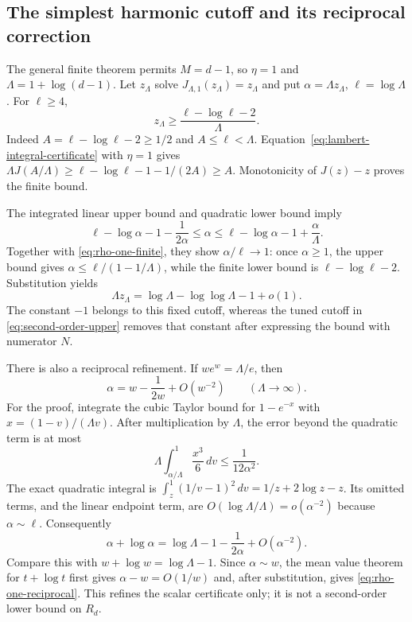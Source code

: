 \subsection{The simplest harmonic cutoff and its reciprocal correction}
\label{app:reciprocal-cutoff}
The general finite theorem permits $M=d-1$, so $\eta=1$ and
$\Lambda=1+\log(d-1)$. Let $z_\Lambda$ solve
$J_{\Lambda,1}(z_\Lambda)=z_\Lambda$ and put
$\alpha=\Lambda z_\Lambda$, $\ell=\log\Lambda$. For $\ell\ge4$,
\begin{equation}\label{eq:rho-one-finite}
 z_\Lambda\ge\frac{\ell-\log\ell-2}{\Lambda}.
\end{equation}
Indeed $A=\ell-\log\ell-2\ge1/2$ and $A\le\ell<\Lambda$.
Equation~\eqref{eq:lambert-integral-certificate} with $\eta=1$ gives
$\Lambda J(A/\Lambda)\ge\ell-\log\ell-1-1/(2A)\ge A$.
Monotonicity of $J(z)-z$ proves the finite bound.

The integrated linear upper bound and quadratic lower bound imply
\[
 \ell-\log\alpha-1-\frac1{2\alpha}
 \le\alpha\le\ell-\log\alpha-1+\frac\alpha\Lambda.
\]
Together with \eqref{eq:rho-one-finite}, they show $\alpha/\ell\to1$:
once $\alpha\ge1$, the upper bound gives
$\alpha\le\ell/(1-1/\Lambda)$, while the finite lower bound is
$\ell-\log\ell-2$. Substitution yields
\begin{equation}\label{eq:rho-one-asymptotic}
 \Lambda z_\Lambda=\log\Lambda-\log\log\Lambda-1+o(1).
\end{equation}
The constant $-1$ belongs to this fixed cutoff, whereas the tuned
cutoff in \eqref{eq:second-order-upper} removes that constant after
expressing the bound with numerator $N$.

There is also a reciprocal refinement. If $w e^w=\Lambda/e$, then
\begin{equation}\label{eq:rho-one-reciprocal}
 \alpha=w-\frac1{2w}+O(w^{-2})\qquad(\Lambda\to\infty).
\end{equation}
For the proof, integrate the cubic Taylor bound for $1-e^{-x}$ with
$x=(1-v)/(\Lambda v)$. After multiplication by $\Lambda$, the error
beyond the quadratic term is at most
\[
 \Lambda\int_{\alpha/\Lambda}^1\frac{x^3}{6}\,dv
 \le\frac1{12\alpha^2}.
\]
The exact quadratic integral is
$\int_z^1(1/v-1)^2\,dv=1/z+2\log z-z$.
Its omitted terms, and the linear endpoint term, are
$O(\log\Lambda/\Lambda)=o(\alpha^{-2})$ because $\alpha\sim\ell$.
Consequently
\[
 \alpha+\log\alpha=\log\Lambda-1-\frac1{2\alpha}
                       +O(\alpha^{-2}).
\]
Compare this with $w+\log w=\log\Lambda-1$. Since $\alpha\sim w$,
the mean value theorem for $t+\log t$ first gives
$\alpha-w=O(1/w)$ and, after substitution, gives
\eqref{eq:rho-one-reciprocal}. This refines the scalar certificate only;
it is not a second-order lower bound on $R_d$.

